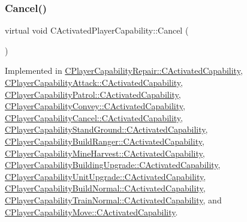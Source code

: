 \subsubsection{\texorpdfstring{Cancel()}{Cancel()}}
{\footnotesize\ttfamily virtual void C\+Activated\+Player\+Capability\+::\+Cancel (\begin{DoxyParamCaption}{ }\end{DoxyParamCaption})\hspace{0.3cm}{\ttfamily [pure virtual]}}



Implemented in \hyperlink{classCPlayerCapabilityRepair_1_1CActivatedCapability_a719cee3446291470987f504739f63215}{C\+Player\+Capability\+Repair\+::\+C\+Activated\+Capability}, \hyperlink{classCPlayerCapabilityAttack_1_1CActivatedCapability_a0796fbda8a35b60a2320becfdf2b5c13}{C\+Player\+Capability\+Attack\+::\+C\+Activated\+Capability}, \hyperlink{classCPlayerCapabilityPatrol_1_1CActivatedCapability_a36165c232eb283ce4a92bd4606480c73}{C\+Player\+Capability\+Patrol\+::\+C\+Activated\+Capability}, \hyperlink{classCPlayerCapabilityConvey_1_1CActivatedCapability_ad84a94a1ae3647ea160e262a0154e229}{C\+Player\+Capability\+Convey\+::\+C\+Activated\+Capability}, \hyperlink{classCPlayerCapabilityCancel_1_1CActivatedCapability_accd67b449574b6c99e21f522d13bc96a}{C\+Player\+Capability\+Cancel\+::\+C\+Activated\+Capability}, \hyperlink{classCPlayerCapabilityStandGround_1_1CActivatedCapability_ac75cd8a26726adb60cf045f99059ca7d}{C\+Player\+Capability\+Stand\+Ground\+::\+C\+Activated\+Capability}, \hyperlink{classCPlayerCapabilityBuildRanger_1_1CActivatedCapability_a46a5240502d6a8de65d3d56bbda8bf91}{C\+Player\+Capability\+Build\+Ranger\+::\+C\+Activated\+Capability}, \hyperlink{classCPlayerCapabilityMineHarvest_1_1CActivatedCapability_ab1fef064fbc085a6419b5a822e787614}{C\+Player\+Capability\+Mine\+Harvest\+::\+C\+Activated\+Capability}, \hyperlink{classCPlayerCapabilityBuildingUpgrade_1_1CActivatedCapability_adca97e7f7611f4adfcfea615428dac0b}{C\+Player\+Capability\+Building\+Upgrade\+::\+C\+Activated\+Capability}, \hyperlink{classCPlayerCapabilityUnitUpgrade_1_1CActivatedCapability_a29b41666081cf420e9f3b7d93c09920b}{C\+Player\+Capability\+Unit\+Upgrade\+::\+C\+Activated\+Capability}, \hyperlink{classCPlayerCapabilityBuildNormal_1_1CActivatedCapability_a7cc74f98f4071edfa75395d02d897fef}{C\+Player\+Capability\+Build\+Normal\+::\+C\+Activated\+Capability}, \hyperlink{classCPlayerCapabilityTrainNormal_1_1CActivatedCapability_a028dc1f8c528cc726737d712f0236884}{C\+Player\+Capability\+Train\+Normal\+::\+C\+Activated\+Capability}, and \hyperlink{classCPlayerCapabilityMove_1_1CActivatedCapability_a6fe1e26646bd14e94ebf7abd0a41cdd3}{C\+Player\+Capability\+Move\+::\+C\+Activated\+Capability}.



